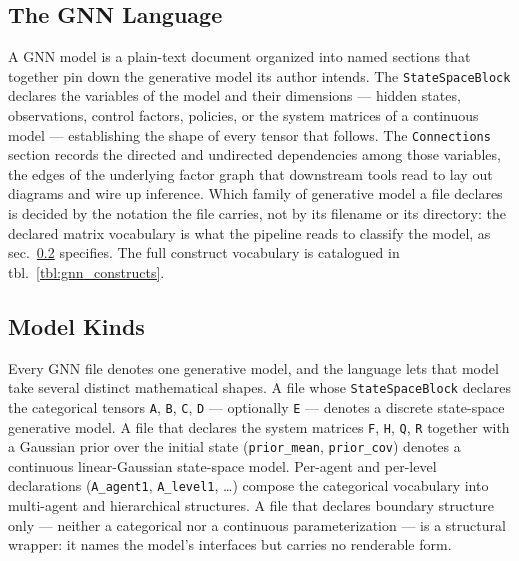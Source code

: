 \documentclass[
  english,
  9pt,
]{extarticle}
\begin{document}
\subsection{The GNN Language}\label{the-gnn-language}

A GNN model is a plain-text document organized into named sections that
together pin down the generative model its author intends. The
\texttt{StateSpaceBlock} declares the variables of the model and their
dimensions --- hidden states, observations, control factors, policies,
or the system matrices of a continuous model --- establishing the shape
of every tensor that follows. The \texttt{Connections} section records
the directed and undirected dependencies among those variables, the
edges of the underlying factor graph that downstream tools read to lay
out diagrams and wire up inference. Which family of generative model a
file declares is decided by the notation the file carries, not by its
filename or its directory: the declared matrix vocabulary is what the
pipeline reads to classify the model, as sec.~\ref{sec:model_kinds}
specifies. The full construct vocabulary is catalogued in
tbl.~\ref{tbl:gnn_constructs}.

\subsection{Model Kinds}\label{sec:model_kinds}

Every GNN file denotes one generative model, and the language lets that
model take several distinct mathematical shapes. A file whose
\texttt{StateSpaceBlock} declares the categorical tensors \texttt{A},
\texttt{B}, \texttt{C}, \texttt{D} --- optionally \texttt{E} --- denotes
a discrete state-space generative model. A file that declares the system
matrices \texttt{F}, \texttt{H}, \texttt{Q}, \texttt{R} together with a
Gaussian prior over the initial state (\texttt{prior\_mean},
\texttt{prior\_cov}) denotes a continuous linear-Gaussian state-space
model. Per-agent and per-level declarations (\texttt{A\_agent1},
\texttt{A\_level1}, \ldots) compose the categorical vocabulary into
multi-agent and hierarchical structures. A file that declares boundary
structure only --- neither a categorical nor a continuous
parameterization --- is a structural wrapper: it names the model's
interfaces but carries no renderable form.
\end{document}
